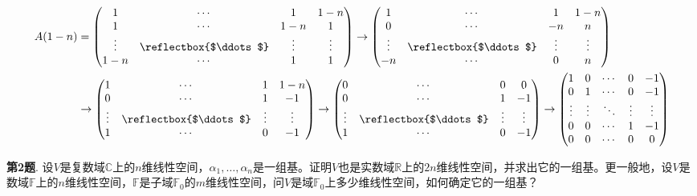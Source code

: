 \begin{align*}
    A(1-n) & = \begin{pmatrix} 1 & \cdots & 1 & 1-n \\ 1 & \cdots & 1-n & 1 \\ \vdots & \reflectbox{$\ddots$} & \vdots & \vdots \\ 1-n & \cdots & 1 & 1 \end{pmatrix} \to \begin{pmatrix} 1 & \cdots & 1 & 1-n \\ 0 & \cdots & -n & n \\ \vdots & \reflectbox{$\ddots$} & \vdots & \vdots \\ -n & \cdots & 0 & n \end{pmatrix} \\
    & \to \begin{pmatrix} 1 & \cdots & 1 & 1-n \\ 0 & \cdots & 1 & -1 \\ \vdots & \reflectbox{$\ddots$} & \vdots & \vdots \\ 1 & \cdots & 0 & -1 \end{pmatrix} \to \begin{pmatrix} 0 & \cdots & 0 & 0 \\ 0 & \cdots & 1 & -1 \\ \vdots & \reflectbox{$\ddots$} & \vdots & \vdots \\ 1 & \cdots & 0 & -1 \end{pmatrix} \to \begin{pmatrix} 1 & 0 & \cdots & 0 & -1 \\ 0 & 1 & \cdots & 0 & -1 \\ \vdots & \vdots & \ddots & \vdots & \vdots \\ 0 & 0 & \cdots & 1 & -1 \\ 0 & 0 & \cdots & 0 & 0 \end{pmatrix}
\end{align*}

\newpageorvspace

{\bf 第2题}. 设$V$是复数域$\mathbb{C}$上的$n$维线性空间，$\alpha_1,\ldots,\alpha_n$是一组基。证明$V$也是实数域$\mathbb{R}$上的$2n$维线性空间，并求出它的一组基。更一般地，设$V$是数域$\mathbb{F}$上的$n$维线性空间，$\mathbb{F}$是子域$\mathbb{F}_0$的$m$维线性空间，问$V$是域$\mathbb{F}_0$上多少维线性空间，如何确定它的一组基？

